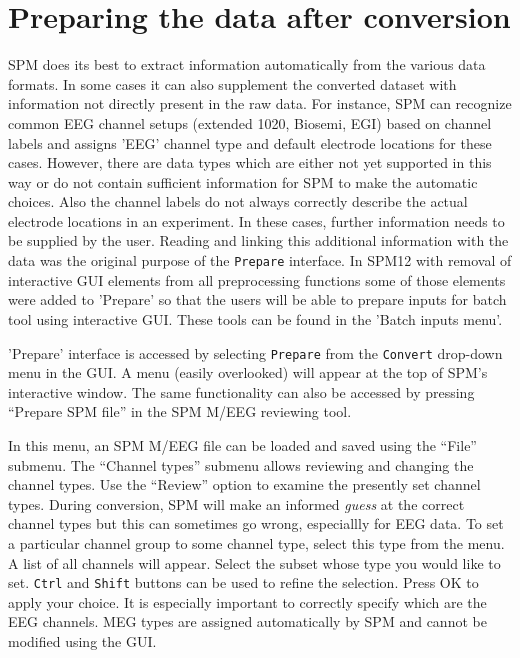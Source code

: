 \section{Preparing the data after conversion}
SPM does its best to extract information automatically from the various data formats. In some cases it can also supplement the converted dataset with information not directly present in the raw data. For instance, SPM can recognize common EEG channel setups (extended 1020, Biosemi, EGI) based on channel labels and assigns 'EEG' channel type and default electrode locations for these cases. However, there are data types which are either not yet supported in this way or do not contain sufficient information for SPM to make the automatic choices. Also the channel labels do not always correctly describe the actual electrode locations in an experiment. In these cases, further information needs to be supplied by the user. Reading and linking this additional information with the data was the original purpose of the \texttt{Prepare} interface. In SPM12 with removal of interactive GUI elements from all preprocessing functions some of those elements were added to 'Prepare' so that the users will be able to prepare inputs for batch tool using interactive GUI. These tools can be found in the 'Batch inputs menu'.

'Prepare' interface is accessed by selecting \texttt{Prepare} from the \texttt{Convert} drop-down menu in the GUI. A menu (easily overlooked) will appear at the top of SPM's interactive window. The same functionality can also be accessed by pressing ``Prepare SPM file'' in the SPM M/EEG reviewing tool.

In this menu, an SPM M/EEG file can be loaded and saved using the ``File'' submenu. The ``Channel types'' submenu allows reviewing and changing the channel types. Use the ``Review'' option to examine the presently set channel types. During conversion, SPM  will make an informed \textit{guess} at the correct channel types but this can sometimes go wrong, especiallly for EEG data. To set a particular channel group to some channel type, select this type from the menu. A list of all channels will appear. Select the subset whose type you would like to set. \texttt{Ctrl} and \texttt{Shift} buttons can be used to refine the selection. Press OK to apply your choice. It is especially important to correctly specify which are the EEG channels. MEG types are assigned automatically by SPM and cannot be modified using the GUI.

